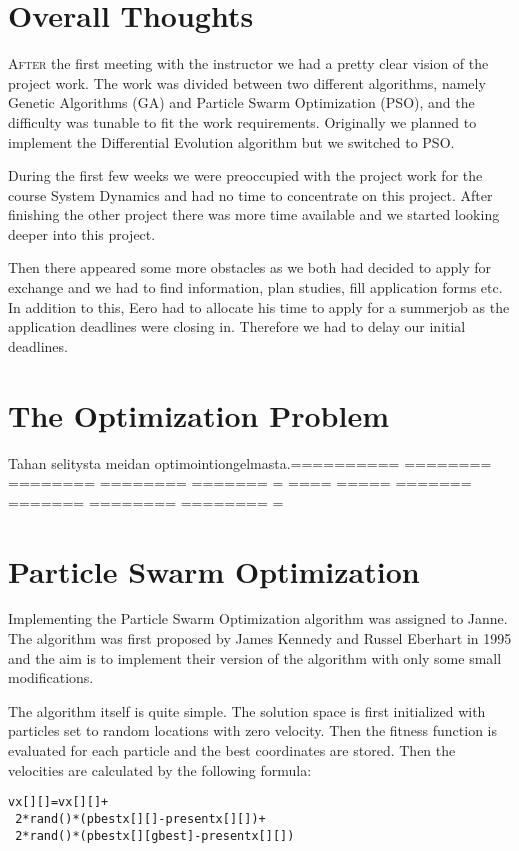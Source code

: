\documentclass[twoside]{article}
\begin{document}
\begin{multicols}{2} %

\section{Overall Thoughts}

\lettrine[nindent=0em,lines=3]{A}{fter} the first meeting with the instructor we had a pretty clear vision of the project work. The work was divided between two different algorithms, namely Genetic Algorithms (GA) and Particle Swarm Optimization (PSO), and the difficulty was tunable to fit the work requirements. Originally we planned to implement the Differential Evolution algorithm but we switched to PSO.

During the first few weeks we were preoccupied with the project work for the course System Dynamics and had no time to concentrate on this project. After finishing the other project there was more time available and we started looking deeper into this project.

Then there appeared some more obstacles as we both had decided to apply for exchange and we had to find information, plan studies, fill application forms etc. In addition to this, Eero had to allocate his time to apply for a summerjob as the application deadlines were closing in. Therefore we had to delay our initial deadlines.


\section{The Optimization Problem}
Tahan selitysta meidan optimointiongelmasta.========== ======== ======== ======== ======= =
==== ===== ======= ======= ======== ======== =


\section{Particle Swarm Optimization}

Implementing the Particle Swarm Optimization algorithm was assigned to Janne. The algorithm was first proposed by James Kennedy and Russel Eberhart in 1995 and the aim is to implement their version of the algorithm with only some small modifications.

The algorithm itself is quite simple. The solution space is first initialized with particles set to random locations with zero velocity. Then the fitness function is evaluated for each particle and the best coordinates are stored. Then the velocities are calculated by the following formula: \cite{pso}
\begin{verbatim}
vx[][]=vx[][]+
 2*rand()*(pbestx[][]-presentx[][])+
 2*rand()*(pbestx[][gbest]-presentx[][])
\end{verbatim}


\end{multicols}
\end{document}
